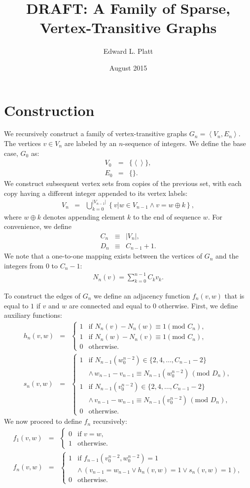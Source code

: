 \documentclass{article}
\title{DRAFT: A Family of Sparse, Vertex-Transitive Graphs}
\author{Edward L. Platt}
\date{August 2015}
\newcommand{\la}{\left\langle}
\newcommand{\ra}{\right\rangle}
\newcommand{\beq}{\begin{eqnarray}}
\newcommand{\eeq}{\end{eqnarray}}
\newcommand{\append}{\oplus}
\begin{document}
\maketitle

\section{Construction}

We recursively construct a family of vertex-transitive graphs
$G_n = \la V_n, E_n \ra$.
The vertices $v \in V_n$ are labeled by an $n$-sequence of integers.
We define the base case, $G_0$ as:
\beq
V_0 &=& \{\la \ra\}, \\
E_0 &=& \{\}.
\eeq
We construct subsequent vertex sets from copies of the previous set,
with each copy having a different integer appended to its vertex labels:
\beq
V_n &=& \bigcup_{k = 0}^{|V_{n-1}|}
\left\{ v | w \in V_{n-1} \land v = w \append k \right\},
\eeq
where $w \append k$ denotes appending element $k$ to the end of sequence $w$.
For convenience, we define
\beq
C_n &\equiv& |V_n|, \\
D_n &\equiv& C_{n-1} + 1.
\eeq
We note that a one-to-one mapping exists between the vertices of $G_n$ and the
integers from $0$ to $C_n - 1$:
\beq
N_n(v) = \sum_{k=0}^{n-1} C_k v_k.
\eeq

To construct the edges of $G_n$ we define an adjacency function $f_n(v,w)$
that is equal to $1$ if $v$ and $w$ are connected and equal to $0$ otherwise.
First, we define auxiliary functions:
\beq
h_n(v,w)
&=&
\begin{cases}
1 & \mbox{if } N_n(v) - N_n(w) \equiv 1 (\mbox{mod } C_n), \\
1 & \mbox{if } N_n(w) - N_n(v) \equiv 1 (\mbox{mod } C_n), \\
0 & \mbox{otherwise}.
\end{cases} \\
s_n(v,w)
&=&
\begin{cases}
1 & \mbox{if }
N_{n-1}(w_0^{n-2}) \in \{ 2, 4, \ldots, C_{n-1} - 2\} \\
&
\land \, w_{n-1} - v_{n-1} \equiv N_{n-1}(w_0^{n-2}) \, (\mbox{mod } D_n), \\
1 & \mbox{if }
N_{n-1}(v_0^{n-2}) \in \{ 2, 4, \ldots, C_{n-1} - 2\} \\
&
\land \, v_{n-1} - w_{n-1} \equiv N_{n-1}(v_0^{n-2}) \, (\mbox{mod } D_n), \\
0 & \mbox{otherwise}.
\end{cases}
\eeq
We now proceed to define $f_n$ recursively:
\beq
f_1(v,w)
&=&
\begin{cases}
0 & \mbox{if } v = w, \\
1 & \mbox{otherwise}.
\end{cases} \\
f_n(v,w)
&=&
\begin{cases}
1 & \mbox{if } f_{n-1}(v_0^{n-2}, w_0^{n-2}) = 1 \\
&
\land \, (v_{n-1} = w_{n-1}
\lor
h_n(v, w) = 1
\lor
s_n(v, w) = 1
),\\
0 & \mbox{otherwise}.
\end{cases}
\eeq



\end{document}
